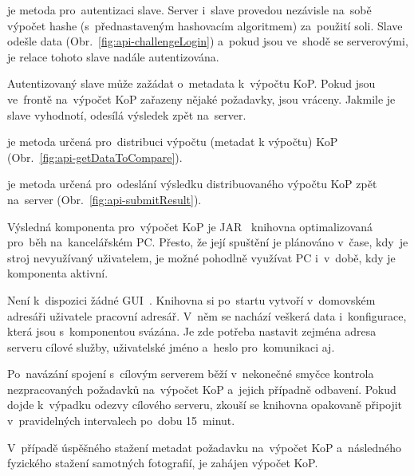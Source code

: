 
 je metoda pro~autentizaci slave. Server i~slave provedou nezávisle na~sobě výpočet hashe (s~přednastaveným hashovacím algoritmem) za~použití soli. Slave odešle data (Obr.~\ref{fig:api-challengeLogin}) a~pokud jsou ve~shodě se serverovými, je relace tohoto slave nadále autentizována.


Autentizovaný slave může zažádat o~metadata k~výpočtu KoP. Pokud jsou ve~frontě na~výpočet KoP zařazeny nějaké požadavky, jsou vráceny. Jakmile je slave vyhodnotí, odesílá výsledek zpět na~server.

je metoda určená pro~distribuci výpočtu (metadat k výpočtu) KoP (Obr.~\ref{fig:api-getDataToCompare}).


je metoda určená pro~odeslání výsledku distribuovaného výpočtu KoP zpět na~server (Obr.~\ref{fig:api-submitResult}).





Výsledná komponenta pro~výpočet KoP je JAR~\cite{jar} knihovna optimalizovaná pro~běh na~kancelářském PC. Přesto, že její spuštění je plánováno v~čase, kdy~je stroj nevyužívaný uživatelem, je možné pohodlně využívat PC i~v~době, kdy je komponenta aktivní.

Není k~dispozici žádné GUI~\cite{gui}. Knihovna si po~startu vytvoří v~domovském adresáři uživatele pracovní adresář. V~něm se nachází veškerá data i~konfigurace, která jsou s~komponentou svázána. Je zde potřeba nastavit zejména adresa serveru cílové služby, uživatelské jméno a~heslo pro~komunikaci aj.

Po~navázání spojení s~cílovým serverem běží v~nekonečné smyčce kontrola nezpracovaných požadavků na~výpočet KoP a~jejich případně odbavení. Pokud dojde k~výpadku odezvy cílového serveru, zkouší se knihovna opakovaně připojit v~pravidelných intervalech po~dobu 15~minut.

V~případě úspěšného stažení metadat požadavku na~výpočet KoP a~následného fyzického stažení samotných fotografií, je zahájen výpočet KoP.

